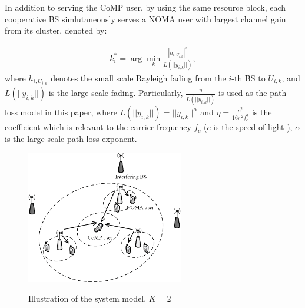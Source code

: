 \documentclass[10pt, doublecolumn]{IEEEtran}
\newcommand{\Equ}[1]{
  \begin{align}
    #1
  \end{align}}
\begin{document}
In addition to serving the CoMP user, by using the same resource block, each cooperative BS simlutaneously serves a NOMA user with largest channel gain from its cluster, denoted by:
\Equ{
   k^*_i= \arg\min\limits_{k}\frac{|h_{i,U_{i,k}}|^2}{L(||y_{i,k}||)},
}
 where $h_{i,U_{i,k}}$ denotes the small scale Rayleigh fading from the $i$-th BS to $U_{i,k}$, and $L(||y_{i,k}||)$ is the large scale fading. Particularly, $\frac{\eta}{L(||y_{i,k}||)}$ is used as the  path loss model in this paper, where $L(||y_{i,k}||)=||y_{i,k}||^{\alpha}$ and $\eta=\frac{c^2}{16\pi^2f_c^2}$ is the coefficient which is relevant to the carrier frequency $f_c$ ($c$ is the speed of light ), $\alpha$ is the large scale path loss exponent.
\begin{figure}[!t]
\vspace{-1em}
\setlength{\abovecaptionskip}{0em}   %
\setlength{\belowcaptionskip}{-1em}   %
  \centering
  \includegraphics[width=2.7in]{system_model.eps}\\
  \caption{Illustration of the system model. $K=2$}\label{system_model}
  \label{system_model}
\end{figure}
\end{document}
